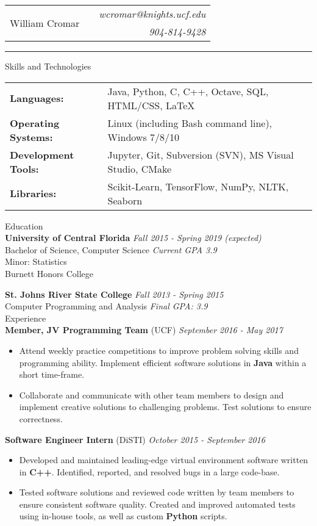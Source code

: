 \documentclass[letterpaper,11pt,oneside]{article}
\newcommand{\mkheader}[3]{
  {\fontfamily{pag}\selectfont
  \begin{tabularx}{\textwidth}{lXr}
    \multirow{2}{*}{\Huge #1} && \emph{#2}
    \\ && \emph{#3}
  \end{tabularx}
  }
  \vspace{2pt}
  \hrule
}
\newcommand{\resheader}[2][]{
  \vspace{9pt}
  {\LARGE #2} #1
  \\
}
\newcommand{\ressubheader}[3][]{
  \vspace{6pt}
  {\large \textbf{#2} #1} \hfill \emph{#3}
  \\
}
\newcommand{\resskill}[1]{\textbf{#1}}
\begin{document}
\mkheader{William Cromar}{wcromar@knights.ucf.edu}{904-814-9428}

\resheader{Skills and Technologies}
\vspace{6pt}
\begin{tabular}{>{\bfseries}l@{\hskip .25cm} l}
  Languages: & Java, Python, C, C++, Octave, SQL, HTML/CSS, LaTeX \\
  Operating Systems: & Linux (including Bash command line), Windows 7/8/10 \\
  Development Tools: & Jupyter, Git, Subversion (SVN), MS Visual Studio, CMake \\
  Libraries: & Scikit-Learn, TensorFlow, NumPy, NLTK, Seaborn
\end{tabular}


\resheader{Education}
\ressubheader{University of Central Florida}{Fall 2015 - Spring 2019 (expected)}
Bachelor of Science, Computer Science \hfill \emph{Current GPA 3.9} \\
Minor: Statistics \\
Burnett Honors College

\ressubheader{St. Johns River State College}{Fall 2013 - Spring 2015}
Computer Programming and Analysis \hfill \emph{Final GPA: 3.9} \\

\resheader{Experience}
\ressubheader[(UCF)]{Member, JV Programming Team}{September 2016 - May 2017}
\begin{itemize}
  \item Attend weekly practice competitions to improve problem solving skills
    and programming ability. Implement efficient software solutions in
    \resskill{Java} within a short time-frame. 
  \item Collaborate and communicate with other team members to design and
    implement creative solutions to challenging problems. Test solutions to
    ensure correctness.
\end{itemize}

\ressubheader[(DiSTI)]{Software Engineer Intern}{October 2015 - September 2016}
\begin{itemize}
  \item Developed and maintained leading-edge virtual environment software
    written in \resskill{C++}. Identified, reported, and resolved bugs in a
    large code-base.
  \item Tested software solutions and reviewed code written by team members to
    ensure consistent software quality. Created and improved automated tests
    using in-house tools, as well as custom \resskill{Python} scripts.
\end{itemize}
\end{document}

